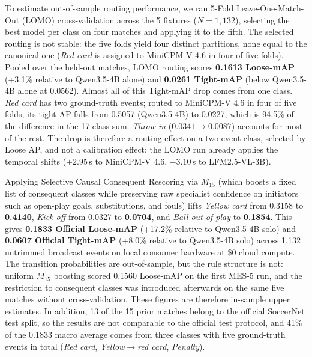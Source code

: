 \documentclass[10pt,twocolumn,letterpaper]{article}
\begin{document}
To estimate out-of-sample routing performance, we ran 5-Fold Leave-One-Match-Out (LOMO) cross-validation across the 5 fixtures ($N=1,132$), selecting the best model per class on four matches and applying it to the fifth. The selected routing is not stable: the five folds yield four distinct partitions, none equal to the canonical one (\textit{Red card} is assigned to MiniCPM-V 4.6 in four of five folds). Pooled over the held-out matches, LOMO routing scores \textbf{0.1613 Loose-mAP} (+3.1\% relative to Qwen3.5-4B alone) and \textbf{0.0261 Tight-mAP} (below Qwen3.5-4B alone at 0.0562). Almost all of this Tight-mAP drop comes from one class. \textit{Red card} has two ground-truth events; routed to MiniCPM-V 4.6 in four of five folds, its tight AP falls from 0.5057 (Qwen3.5-4B) to 0.0227, which is 94.5\% of the difference in the 17-class sum. \textit{Throw-in} ($0.0341 \to 0.0087$) accounts for most of the rest. The drop is therefore a routing effect on a two-event class, selected by Loose AP, and not a calibration effect: the LOMO run already applies the temporal shifts ($+2.95$\,s to MiniCPM-V 4.6, $-3.10$\,s to LFM2.5-VL-3B).

Applying Selective Causal Consequent Rescoring via $M_{15}$ (which boosts a fixed list of consequent classes while preserving raw specialist confidence on initiators such as open-play goals, substitutions, and fouls) lifts \textit{Yellow card} from 0.3158 to \textbf{0.4140}, \textit{Kick-off} from 0.0327 to \textbf{0.0704}, and \textit{Ball out of play} to \textbf{0.1854}. This gives \textbf{0.1833 Official Loose-mAP} (+17.2\% relative to Qwen3.5-4B solo) and \textbf{0.0607 Official Tight-mAP} (+8.0\% relative to Qwen3.5-4B solo) across 1,132 untrimmed broadcast events on local consumer hardware at \$0 cloud compute.
The transition probabilities are out-of-sample, but the rule structure is not: uniform $M_{15}$ boosting scored 0.1560 Loose-mAP on the first MES-5 run, and the restriction to consequent classes was introduced afterwards on the same five matches without cross-validation. These figures are therefore in-sample upper estimates. In addition, 13 of the 15 prior matches belong to the official SoccerNet test split, so the results are not comparable to the official test protocol, and 41\% of the 0.1833 macro average comes from three classes with five ground-truth events in total (\textit{Red card}, \textit{Yellow$\to$red card}, \textit{Penalty}).
\end{document}

